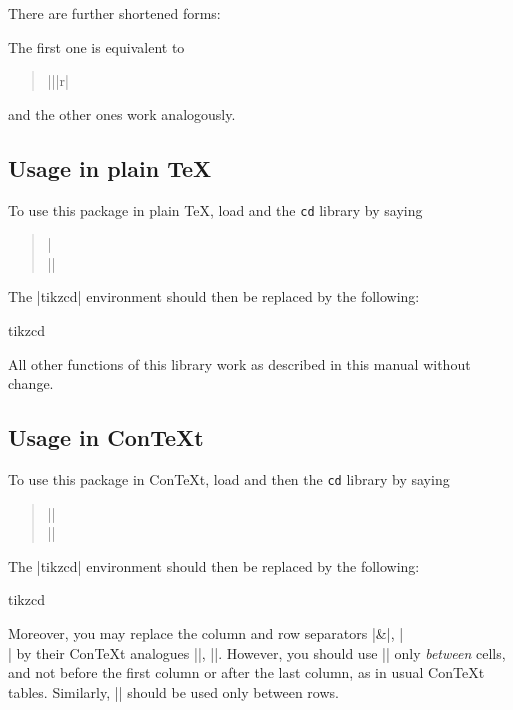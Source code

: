 \documentclass[a4paper]{ltxdoc}
\begin{document}
There are further shortened forms:
\begin{pgfmanualentry}
  \extractcommand\rar{}\@@
  \extractcommand\lar{}\@@
  \extractcommand\dar{}\@@
  \extractcommand\uar{}\@@
  \extractcommand\drar{}\@@
  \extractcommand\urar{}\@@
  \extractcommand\dlar{}\@@
  \extractcommand\ular{}\@@
  \pgfmanualbody
\end{pgfmanualentry}
The first one is equivalent to
\begin{verse}
  |\arrow|{}|{r}|
\end{verse}
and the other ones work analogously.

\subsection{Usage in plain \TeX{}}
\label{sec:usage-plain-tex}

To use this package in plain \TeX{}, load \tikzname{} and the
\texttt{cd} library by saying
\begin{verse}
  |\\
  |\usetikzlibrary{cd}|
\end{verse}
The |{tikzcd}| environment should then be replaced by the following:
\begin{plainenvironment}{{tikzcd}}
\end{plainenvironment}
All other functions of this library work as described in this manual
without change.

\subsection{Usage in Con\TeX t}
\label{sec:usage-context}

To use this package in Con\TeX t, load \tikzname{} and then the
\texttt{cd} library by saying
\begin{verse}
  |\usemodule[tikz]|\\
  |\usetikzlibrary[cd]|
\end{verse}
The |{tikzcd}| environment should then be replaced by the following:
\begin{contextenvironment}{{tikzcd}}
\end{contextenvironment}
Moreover, you may replace the column and row separators |&|, |\\| by
their Con\TeX t analogues |\NC|, |\NR|.  However, you should use |\NC|
only \emph{between} cells, and not before the first column or after
the last column, as in usual Con\TeX t tables.  Similarly, |\NR|
should be used only between rows.
\end{document}

